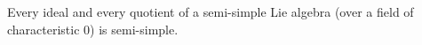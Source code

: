 Every ideal and every quotient of a semi-simple Lie algebra (over a field of characteristic $0$) is semi-simple.
